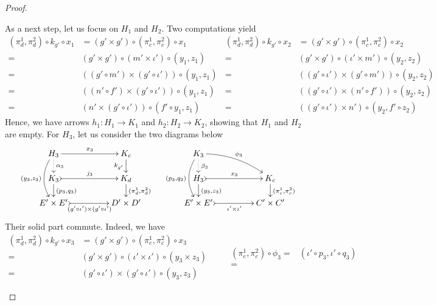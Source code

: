 \documentclass[3p]{elsarticle}
\theoremstyle{remark}
\theoremstyle{definition}
\begin{document}
\begin{proof}
\begin{enumerate}
As a next step, let us focus on $H_1$ and $H_2$. Two computations yield \small
 \[\begin{split}
(\pi^1_d, \pi^2_d)\circ k_{g'}\circ x_1&=(g'\times g')\circ (\pi^1_c, \pi^2_c)\circ x_1\\=&(g'\times g')\circ (m'\times \iota')\circ (y_1, z_1)\\=&((g'\circ m') \times (g'\circ \iota'))\circ (y_1, z_1)\\=&((n'\circ f') \times (g'\circ \iota'))\circ (y_1, z_1)\\=&(n'\times  (g'\circ \iota'))\circ (f'\circ y_1, z_1)
 \end{split} \hspace{1pt} \begin{split}
 (\pi^1_d, \pi^2_d)\circ k_{g'}\circ x_2&=(g'\times g')\circ (\pi^1_c, \pi^2_c)\circ x_2\\=&(g'\times g')\circ ( \iota' \times m')\circ (y_2, z_2)\\=&((g'\circ \iota') \times (g'\circ m'))\circ (y_2, z_2)\\=&( (g'\circ \iota') \times (n'\circ f'))\circ (y_2, z_2)\\=&((g'\circ \iota') \times n')\circ (y_2, f'\circ z_2)
 \end{split} \]
\normalsize
 Hence, we have arrows $h_1\colon H_1\to K_1$ and $h_2\colon H_2\to K_2$, showing that $H_1$ and $H_2$ are empty. For $H_3$, let us consider the two diagrams below
 \[ \xymatrix@C=45pt@R=15pt{ H_3 \ar@{.>}[d]^{\alpha_3} \ar[r]^{x_3} \ar@/_.4cm/[dd]_{(y_3, z_3)} & K_c \ar[d]_{k_{g'}}& K_3 \ar@{.>}[d]^{\beta_3} \ar@/^.3cm$ $/[dr]^{\phi_3} \ar@/_.4cm/[dd]_{(p_3, q_3)}\\K_3 \ar@{>->}[r]^{j_3}  \ar[d]^{(p_3, q_3)} & K_d \ar[d]^{(\pi^1_d, \pi^2_d)} &  H_3 \ar@{>->}[r]^{x_3}  \ar[d]^{(y_3, z_3)} & K_c \ar[d]^{(\pi^1_c, \pi^2_c)}  \\
   E'\times E' \ar@{>->}[r]_-{(g'\circ \iota')\times (g'\circ \iota')} & D'\times D' & E'\times E' \ar@{>->}[r]_-{ \iota'\times  \iota'} & C'\times C'}\]
 Their solid part commute. Indeed, we have
 \[\begin{split}
 	(\pi^1_d, \pi^2_d)\circ k_{g'}\circ x_3&=(g'\times g')\circ (\pi^1_c, \pi^2_c) \circ x_3\\=&(g'\times g')\circ (\iota'\times \iota')\circ (y_3\times z_3)\\=&(g'\circ \iota') \times (g'\circ \iota')\circ (y_3, z_3)
 \end{split}\qquad \begin{split}
 (\pi^1_c, \pi^2_c)\circ \phi_3=&(\iota'\circ p_3, \iota' \circ q_3)\\=&

\end{split}\]
\end{enumerate}
\end{proof}
\end{document}
